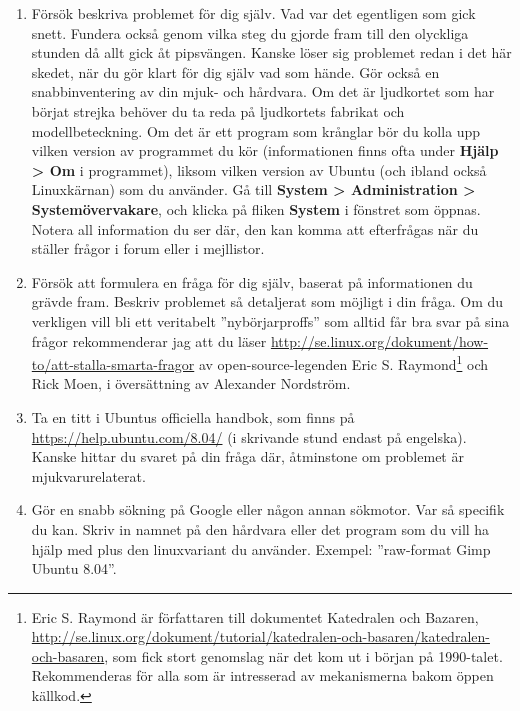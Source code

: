 \documentclass[a4paper,final]{memoir} %
\newcommand\xubuntuver{8.04}
\begin{document}
\begin{enumerate}

\item Försök beskriva problemet för dig själv. Vad var det egentligen som gick snett. Fundera också genom vilka steg du gjorde fram till den olyckliga stunden då allt gick åt pipsvängen. Kanske löser sig problemet redan i det här skedet, när du gör klart för dig själv vad som hände. Gör också en snabbinventering av din mjuk- och hårdvara. Om det är ljudkortet som har börjat strejka behöver du ta reda på ljudkortets fabrikat och modellbeteckning. Om det är ett program som krånglar bör du kolla upp vilken version av programmet du kör (informationen finns ofta under \textbf{Hjälp \textgreater{} Om} i programmet), liksom vilken version av Ubuntu (och ibland också Linuxkärnan) som du använder. Gå till \textbf{System \textgreater{} Administration \textgreater{} Systemövervakare}, och klicka på fliken \textbf{System} i fönstret som öppnas. Notera all information du ser där, den kan komma att efterfrågas när du ställer frågor i forum eller i mejllistor.

\item Försök att formulera en fråga för dig själv, baserat på informationen du grävde fram. Beskriv problemet så detaljerat som möjligt i din fråga. Om du verkligen vill bli ett veritabelt ''nybörjarproffs'' som alltid får bra svar på sina frågor rekommenderar jag att du läser \url{http://se.linux.org/dokument/how-to/att-stalla-smarta-fragor} av open-source-legenden Eric S. Raymond\footnote{Eric S. Raymond är författaren till dokumentet Katedralen och Bazaren, \url{http://se.linux.org/dokument/tutorial/katedralen-och-basaren/katedralen-och-basaren}, som fick stort genomslag när det kom ut i början på 1990-talet. Rekommenderas för alla som är intresserad av mekanismerna bakom öppen källkod.} och Rick Moen, i översättning av Alexander Nordström.

\item Ta en titt i Ubuntus officiella handbok, som finns på \url{https://help.ubuntu.com/8.04/} (i skrivande stund endast på engelska). Kanske hittar du svaret på din fråga där, åtminstone om problemet är mjukvarurelaterat. 

\item Gör en snabb sökning på Google eller någon annan sökmotor. Var så specifik du kan. Skriv in namnet på den hårdvara eller det program som du vill ha hjälp med plus den linuxvariant du använder. Exempel: ''raw-format Gimp Ubuntu \xubuntuver{}''.


\end{enumerate}
\end{document}
